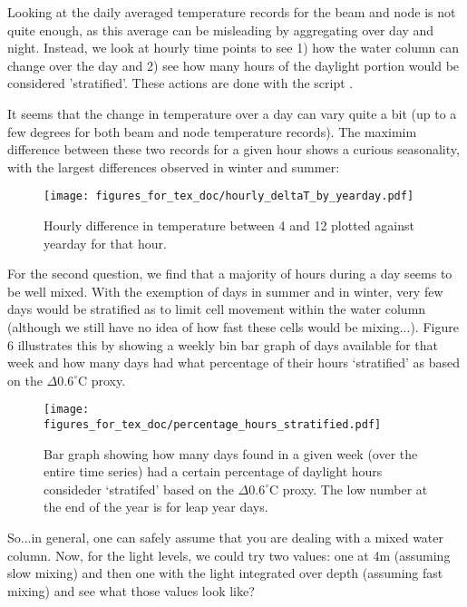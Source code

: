 \documentclass[11pt]{article}
\begin{document}
Looking at the daily averaged temperature records for the beam and node is not quite enough, as this average can be misleading by aggregating over day and night. Instead, we look at hourly time points to see 1) how the water column can change over the day and 2) see how many hours of the daylight portion would be considered 'stratified'. These actions are done with the script .

It seems that the change in temperature over a day can vary quite a bit (up to a few degrees for both beam and node temperature records). The maximim difference between these two records for a given hour shows a curious seasonality, with the largest differences observed in winter and summer:

 \begin{figure}[h]
\centering
\texttt{[image: figures\_for\_tex\_doc/hourly\_deltaT\_by\_yearday.pdf]}
\caption{Hourly difference in temperature between 4 and 12 plotted against yearday for that hour.}
\end{figure}

For the second question, we find that a majority of hours during a day seems to be well mixed. With the exemption of days in summer and in winter, very few days would be stratified as to limit cell movement within the water column (although we still have no idea of how fast these cells would be mixing...).  Figure 6 illustrates this by showing a weekly bin bar graph of days available for that week and how many days had what percentage of their hours `stratified' as based on the $\Delta0.6 ^{\circ}$C proxy.

 \begin{figure}[h]
\centering
\texttt{[image: figures\_for\_tex\_doc/percentage\_hours\_stratified.pdf]}
\caption{Bar graph showing how many days found in a given week (over the entire time series) had a certain percentage of daylight hours consideder `stratifed' based on the $\Delta0.6 ^{\circ}$C proxy. The low number at the end of the year is for leap year days.}
\end{figure}

So...in general, one can safely assume that you are dealing with a mixed water column. Now, for the light levels, we could try two values: one at 4m (assuming slow mixing) and then one with the light integrated over depth (assuming fast mixing) and see what those values look like?
\end{document}

